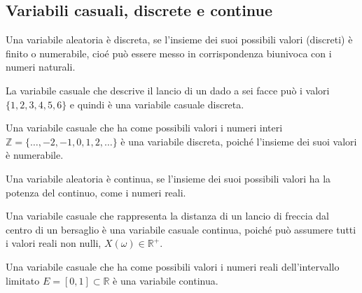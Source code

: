 \subsection{Variabili casuali, discrete e continue}
\begin{definition} Una variabile aleatoria è discreta, se l'insieme dei suoi possibili valori (discreti) è finito o numerabile, cioé può essere messo in corrispondenza biunivoca con i numeri naturali.
\end{definition}
\begin{example} La variabile casuale che descrive il lancio di un dado a sei facce può i valori $\{1,2,3,4,5,6\}$ e quindi è una variabile casuale discreta.
\end{example}
\begin{example} Una variabile casuale che ha come possibili valori i numeri interi $\mathbb{Z} = \{\dots,-2,-1,0,1,2,\dots\}$ è una variabile discreta, poiché l'insieme dei suoi valori è numerabile.
\end{example}
\begin{definition} Una variabile aleatoria è continua, se l'insieme dei suoi possibili valori ha la potenza del continuo, come i numeri reali.
\end{definition}
\begin{example} Una variabile casuale che rappresenta la distanza di un lancio di freccia dal centro di un bersaglio è una variabile casuale continua, poiché può assumere tutti i valori reali non nulli, $X(\omega) \in \mathbb{R}^+$.
\end{example}
\begin{example} Una variabile casuale che ha come possibili valori i numeri reali dell'intervallo limitato $E = [0, 1] \subset \mathbb{R}$ è una variabile continua.
\end{example}
